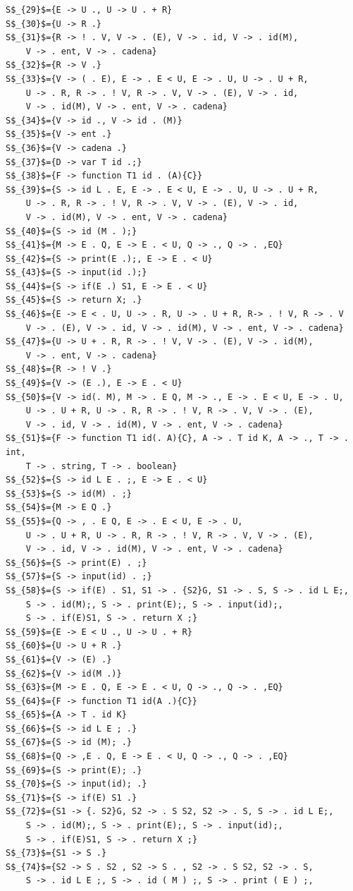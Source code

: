 \documentclass[a4paper, 12pt]{article}
\begin{document}
\begin{lstlisting}[basicstyle=\footnotesize]
S$_{29}$={E -> U ., U -> U . + R}
S$_{30}$={U -> R .}
S$_{31}$={R -> ! . V, V -> . (E), V -> . id, V -> . id(M), 
	V -> . ent, V -> . cadena}
S$_{32}$={R -> V .}
S$_{33}$={V -> ( . E), E -> . E < U, E -> . U, U -> . U + R,
	U -> . R, R -> . ! V, R -> . V, V -> . (E), V -> . id,
	V -> . id(M), V -> . ent, V -> . cadena}
S$_{34}$={V -> id ., V -> id . (M)}
S$_{35}$={V -> ent .}
S$_{36}$={V -> cadena .}
S$_{37}$={D -> var T id .;}
S$_{38}$={F -> function T1 id . (A){C}}
S$_{39}$={S -> id L . E, E -> . E < U, E -> . U, U -> . U + R,
	U -> . R, R -> . ! V, R -> . V, V -> . (E), V -> . id,
	V -> . id(M), V -> . ent, V -> . cadena}
S$_{40}$={S -> id (M . );}
S$_{41}$={M -> E . Q, E -> E . < U, Q -> ., Q -> . ,EQ}
S$_{42}$={S -> print(E .);, E -> E . < U}
S$_{43}$={S -> input(id .);}
S$_{44}$={S -> if(E .) S1, E -> E . < U}
S$_{45}$={S -> return X; .}
S$_{46}$={E -> E < . U, U -> . R, U -> . U + R, R-> . ! V, R -> . V
	V -> . (E), V -> . id, V -> . id(M), V -> . ent, V -> . cadena}
S$_{47}$={U -> U + . R, R -> . ! V, V -> . (E), V -> . id(M), 
	V -> . ent, V -> . cadena}
S$_{48}$={R -> ! V .}
S$_{49}$={V -> (E .), E -> E . < U}
S$_{50}$={V -> id(. M), M -> . E Q, M -> ., E -> . E < U, E -> . U, 
	U -> . U + R, U -> . R, R -> . ! V, R -> . V, V -> . (E),
	V -> . id, V -> . id(M), V -> . ent, V -> . cadena}
S$_{51}$={F -> function T1 id(. A){C}, A -> . T id K, A -> ., T -> . int,
	T -> . string, T -> . boolean}
S$_{52}$={S -> id L E . ;, E -> E . < U}
S$_{53}$={S -> id(M) . ;}
S$_{54}$={M -> E Q .}
S$_{55}$={Q -> , . E Q, E -> . E < U, E -> . U, 
	U -> . U + R, U -> . R, R -> . ! V, R -> . V, V -> . (E),
	V -> . id, V -> . id(M), V -> . ent, V -> . cadena}
S$_{56}$={S -> print(E) . ;}
S$_{57}$={S -> input(id) . ;}
S$_{58}$={S -> if(E) . S1, S1 -> . {S2}G, S1 -> . S, S -> . id L E;,
	S -> . id(M);, S -> . print(E);, S -> . input(id);,
	S -> . if(E)S1, S -> . return X ;}
S$_{59}$={E -> E < U ., U -> U . + R}
S$_{60}$={U -> U + R .}
S$_{61}$={V -> (E) .}
S$_{62}$={V -> id(M .)}
S$_{63}$={M -> E . Q, E -> E . < U, Q -> ., Q -> . ,EQ}
S$_{64}$={F -> function T1 id(A .){C}}
S$_{65}$={A -> T . id K}
S$_{66}$={S -> id L E ; .}
S$_{67}$={S -> id (M); .}
S$_{68}$={Q -> ,E . Q, E -> E . < U, Q -> ., Q -> . ,EQ}
S$_{69}$={S -> print(E); .}
S$_{70}$={S -> input(id); .}
S$_{71}$={S -> if(E) S1 .}
S$_{72}$={S1 -> {. S2}G, S2 -> . S S2, S2 -> . S, S -> . id L E;,
	S -> . id(M);, S -> . print(E);, S -> . input(id);,
	S -> . if(E)S1, S -> . return X ;}
S$_{73}$={S1 -> S .}
S$_{74}$={S2 -> S . S2 , S2 -> S . , S2 -> . S S2, S2 -> . S, 
	S -> . id L E ;, S -> . id ( M ) ;, S -> . print ( E ) ;,

\end{lstlisting}
\end{document}
